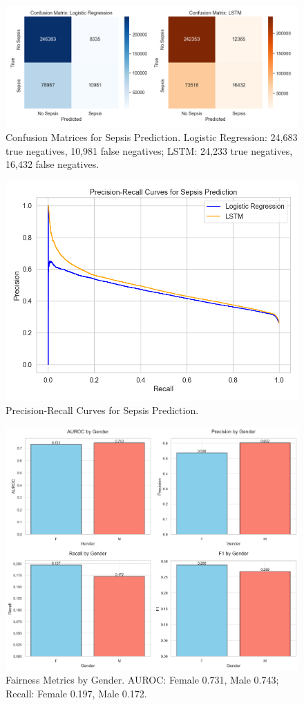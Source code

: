 \documentclass[journal]{IEEEtran}
\begin{document}
\begin{figure}[ht]
    \centering
    \includegraphics[width=0.8\columnwidth]{confusion_matrices.png}
    \caption{Confusion Matrices for Sepsis Prediction. Logistic Regression: 24,683 true negatives, 10,981 false negatives; LSTM: 24,233 true negatives, 16,432 false negatives.}
    \label{fig:cm}
\end{figure}

\begin{figure}[ht]
    \centering
    \includegraphics[width=0.8\columnwidth]{precision_recall_curves.png}
    \caption{Precision-Recall Curves for Sepsis Prediction.}
    \label{fig:pr-curves}
\end{figure}

\begin{figure}[ht]
    \centering
    \includegraphics[width=0.8\columnwidth]{fairness_metrics.png}
    \caption{Fairness Metrics by Gender. AUROC: Female 0.731, Male 0.743; Recall: Female 0.197, Male 0.172.}
    \label{fig:fairness}
\end{figure}
\end{document}
